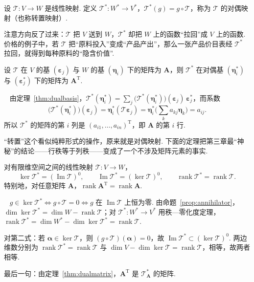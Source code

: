 \documentclass[lang=cn,10.5pt,scheme=chinese,toc=twocol,section,chinesefont=nofont,
twoside,citestyle=gb7714-2015,bibstyle=gb7714-2015]{elegantbook}
\DeclareRobustCommand{\textbf}[1]{{\lnsemiboldlatin\lnsemiboldcjk #1}}
\newcommand{\vv}[1]{\boldsymbol{#1}}
\newcommand{\trans}{\mathrm{T}}             %
\numberwithin{equation}{section}   %
\newcommand{\rk}{\operatorname{rank}}       %
\newcommand{\imm}{\operatorname{Im}}        %
\newcommand*{\lnlabel}[1]{{\sffamily\bfseries\color{black}#1}}
\renewenvironment{proof}{%
	\par\noindent\lnlabel{\proofname}\;\ \color{black!90}\cfs}{\par}
\begin{document}
\begin{definition}
  设 $\mathscr T:V\to W$ 是线性映射. 定义 $\mathscr T^*:W^*\to V^*$，$\mathscr T^*(g)=g\circ\mathscr T$，称为 $\mathscr T$ 的\textbf{对偶映射}（也称\textbf{转置映射}）.
\end{definition}

注意方向反了过来：$\mathscr T$ 把 $V$ 送到 $W$，$\mathscr T^*$ 却把 $W$ 上的函数“拉回”成 $V$ 上的函数. 价格的例子中，若 $\mathscr T$ 把“原料投入”变成“产品产出”，那么一张产品价目表经 $\mathscr T^*$ 拉回，就得到每种原料的“隐含价值”.

\begin{theorem}
  \label{thm:dualmatrix}
  设 $\mathscr T$ 在 $V$ 的基 $(\vv\varepsilon_j)$ 与 $W$ 的基 $(\vv\eta_i)$ 下的矩阵为 $\vv A$，则 $\mathscr T^*$ 在对偶基 $(\vv\eta_i^*)$ 与 $(\vv\varepsilon_j^*)$ 下的矩阵为 $\vv A^\trans$.
\end{theorem}
\begin{proof}
  由定理~\ref{thm:dualbasis}，$\mathscr T^*(\vv\eta_i^*)=\sum_j\big(\mathscr T^*(\vv\eta_i^*)\big)(\vv\varepsilon_j)\,\vv\varepsilon_j^*$，而系数
  \[\big(\mathscr T^*(\vv\eta_i^*)\big)(\vv\varepsilon_j)=\vv\eta_i^*(\mathscr T\vv\varepsilon_j)=\vv\eta_i^*\Big(\sum_ka_{kj}\vv\eta_k\Big)=a_{ij}.\]
  所以 $\mathscr T^*$ 的矩阵的第 $i$ 列是 $(a_{i1},\ldots,a_{in})^\trans$，即 $\vv A$ 的第 $i$ 行.
\end{proof}

“转置”这个看似纯粹形式的操作，原来就是对偶映射. 下面的定理把第三章最“神秘”的结论——行秩等于列秩——变成了一个不涉及矩阵元素的事实.

\begin{theorem}
  \label{thm:dualrank}
  对有限维空间之间的线性映射 $\mathscr T:V\to W$，
  \[\ker\mathscr T^*=(\imm\mathscr T)^0,\qquad\imm\mathscr T^*=(\ker\mathscr T)^0,\qquad\rk\mathscr T^*=\rk\mathscr T.\]
  特别地，对任意矩阵 $\vv A$，$\rk\vv A^\trans=\rk\vv A$.
\end{theorem}
\begin{proof}
  $g\in\ker\mathscr T^*\iff g\circ\mathscr T=0\iff g$ 在 $\imm\mathscr T$ 上恒为零. 由命题~\ref{prop:annihilator}，$\dim\ker\mathscr T^*=\dim W-\rk\mathscr T$；对 $\mathscr T^*:W^*\to V^*$ 用秩—零化度定理，$\rk\mathscr T^*=\dim W^*-\dim\ker\mathscr T^*=\rk\mathscr T$.

  对第二式：若 $\vv\alpha\in\ker\mathscr T$，则 $(g\circ\mathscr T)(\vv\alpha)=0$，故 $\imm\mathscr T^*\subset(\ker\mathscr T)^0$. 两边维数分别为 $\rk\mathscr T^*=\rk\mathscr T$ 与 $\dim V-\dim\ker\mathscr T=\rk\mathscr T$，相等，故两者相等.

  最后一句：由定理~\ref{thm:dualmatrix}，$\vv A^\trans$ 是 $\mathscr T_{\vv A}^*$ 的矩阵.
\end{proof}
\end{document}
